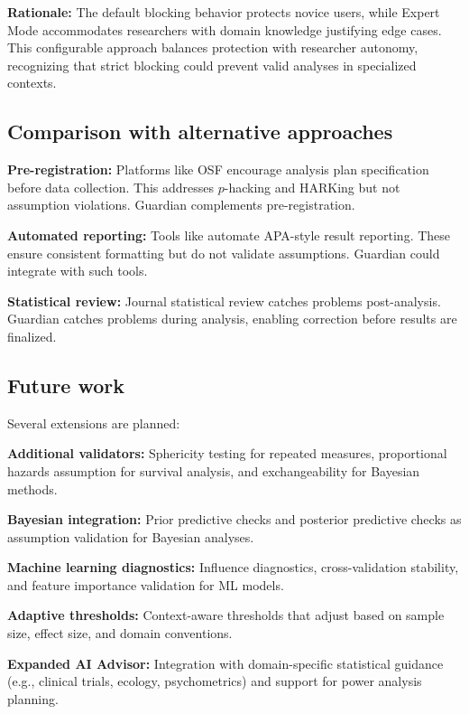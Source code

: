 \documentclass[article]{jss}
\begin{document}
\textbf{Rationale:} The default blocking behavior protects novice users, while Expert Mode accommodates researchers with domain knowledge justifying edge cases. This configurable approach balances protection with researcher autonomy, recognizing that strict blocking could prevent valid analyses in specialized contexts.

\subsection{Comparison with alternative approaches}

\textbf{Pre-registration:} Platforms like OSF encourage analysis plan specification before data collection. This addresses $p$-hacking and HARKing but not assumption violations. Guardian complements pre-registration.

\textbf{Automated reporting:} Tools like  \citep{aust2020papaja} automate APA-style result reporting. These ensure consistent formatting but do not validate assumptions. Guardian could integrate with such tools.

\textbf{Statistical review:} Journal statistical review catches problems post-analysis. Guardian catches problems during analysis, enabling correction before results are finalized.

\subsection{Future work}

Several extensions are planned:

\textbf{Additional validators:} Sphericity testing for repeated measures, proportional hazards assumption for survival analysis, and exchangeability for Bayesian methods.

\textbf{Bayesian integration:} Prior predictive checks and posterior predictive checks as assumption validation for Bayesian analyses.

\textbf{Machine learning diagnostics:} Influence diagnostics, cross-validation stability, and feature importance validation for ML models.

\textbf{Adaptive thresholds:} Context-aware thresholds that adjust based on sample size, effect size, and domain conventions.

\textbf{Expanded AI Advisor:} Integration with domain-specific statistical guidance (e.g., clinical trials, ecology, psychometrics) and support for power analysis planning.
\end{document}
